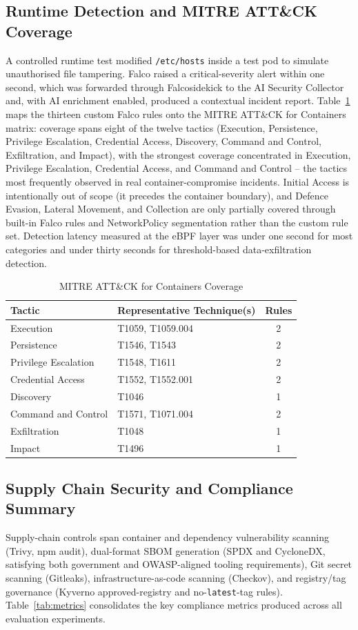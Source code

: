 \documentclass[conference]{IEEEtran}
\begin{document}
\subsection{Runtime Detection and MITRE ATT\&CK Coverage}
A controlled runtime test modified \texttt{/etc/hosts} inside a test pod to simulate unauthorised file tampering. Falco raised a critical-severity alert within one second, which was forwarded through Falcosidekick to the AI Security Collector and, with AI enrichment enabled, produced a contextual incident report. Table~\ref{tab:mitre} maps the thirteen custom Falco rules onto the MITRE ATT\&CK for Containers matrix: coverage spans eight of the twelve tactics (Execution, Persistence, Privilege Escalation, Credential Access, Discovery, Command and Control, Exfiltration, and Impact), with the strongest coverage concentrated in Execution, Privilege Escalation, Credential Access, and Command and Control -- the tactics most frequently observed in real container-compromise incidents. Initial Access is intentionally out of scope (it precedes the container boundary), and Defence Evasion, Lateral Movement, and Collection are only partially covered through built-in Falco rules and NetworkPolicy segmentation rather than the custom rule set. Detection latency measured at the eBPF layer was under one second for most categories and under thirty seconds for threshold-based data-exfiltration detection.

\begin{table}[!t]
\caption{MITRE ATT\&CK for Containers Coverage}
\label{tab:mitre}
\centering
\footnotesize
\begin{tabular}{@{}p{2.3cm}p{2.9cm}c@{}}
\toprule
\textbf{Tactic} & \textbf{Representative Technique(s)} & \textbf{Rules} \\
\midrule
Execution & T1059, T1059.004 & 2 \\
Persistence & T1546, T1543 & 2 \\
Privilege Escalation & T1548, T1611 & 2 \\
Credential Access & T1552, T1552.001 & 2 \\
Discovery & T1046 & 1 \\
Command and Control & T1571, T1071.004 & 2 \\
Exfiltration & T1048 & 1 \\
Impact & T1496 & 1 \\
\bottomrule
\end{tabular}
\end{table}

\subsection{Supply Chain Security and Compliance Summary}
Supply-chain controls span container and dependency vulnerability scanning (Trivy, npm audit), dual-format SBOM generation (SPDX and CycloneDX, satisfying both government and OWASP-aligned tooling requirements), Git secret scanning (Gitleaks), infrastructure-as-code scanning (Checkov), and registry/tag governance (Kyverno approved-registry and no-\texttt{latest}-tag rules). Table~\ref{tab:metrics} consolidates the key compliance metrics produced across all evaluation experiments.
\end{document}
